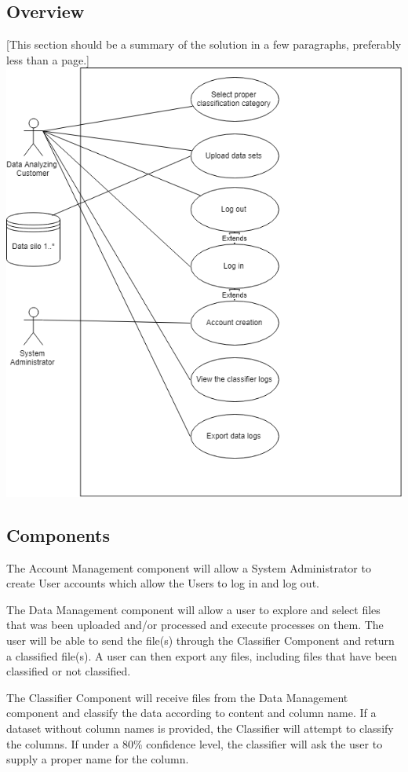 \documentclass[12pt,oneside,letterpaper]{article}
\begin{document}
\subsection{Overview}
[This section should be a summary of the solution in a few paragraphs, preferably less than a page.]
\includegraphics[scale = 0.5]{UseCaseDiagram_Geraldo.png}


\subsection{Components}
The Account Management component will allow a System Administrator to create User accounts which allow the Users to log in and log out.

The Data Management component will allow a user to explore and select files that was been uploaded and/or processed and execute processes on them. The user will be able to send the file(s) through the Classifier Component and return a classified file(s). A user can then export any files, including files that have been classified or not classified.

The Classifier Component will receive files from the Data Management component and classify the data according to content and column name. If a dataset without column names is provided, the Classifier will attempt to classify the columns. If under a 80\% confidence level, the classifier will ask the user to supply a proper name for the column.
\end{document}
